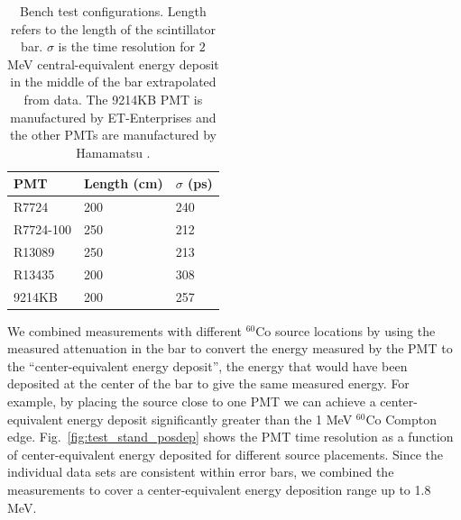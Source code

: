 \documentclass[3p,final,twocolumn]{elsarticle}
\begin{document}
\begin{table}[t]
	\caption{Bench test configurations. Length refers to the length of the scintillator bar.  $\sigma$ is the time
          resolution for $2$ \si{\mega\electronvolt} central-equivalent energy deposit in the middle of the bar
          extrapolated from data.  The 9214KB PMT \cite{pmt9214} is manufactured by ET-Enterprises and the other PMTs are manufactured by Hamamatsu \cite{hamapmts}.}
    \centering
	\begin{tabular}{ m{5em}   m{3em}   m{3em} }
		\hline
			PMT & Length (cm) & $\sigma$ (\si{\pico\second})\\
		\hline\hline
			R7724 &  200 &  240		\\
			R7724-100 & 250 & 212 		\\
			R13089 & 250 & 213			\\			
			R13435 & 200 & 308 			\\		
			9214KB & 200 & 257			\\
		\hline
	\end{tabular}
	\label{tab:tests}
\end{table}

We combined measurements with different $^{60}$Co
source locations by using the measured attenuation in the bar to convert
the energy measured by the PMT to the ``center-equivalent energy
deposit'', the energy that would have been deposited at the center of
the bar to give the same measured energy.  For example, by placing the
source close to one PMT we can achieve a center-equivalent energy
deposit significantly greater than the 1 \si{\mega\electronvolt} $^{60}$Co Compton edge.
Fig.~\ref{fig:test_stand_posdep} shows the PMT time resolution as a
function of  center-equivalent energy deposited for different source placements. Since
the individual data sets are consistent within error bars, we combined
the measurements to cover a center-equivalent energy deposition range
up to 1.8 \si{\mega\electronvolt}.
\end{document}
